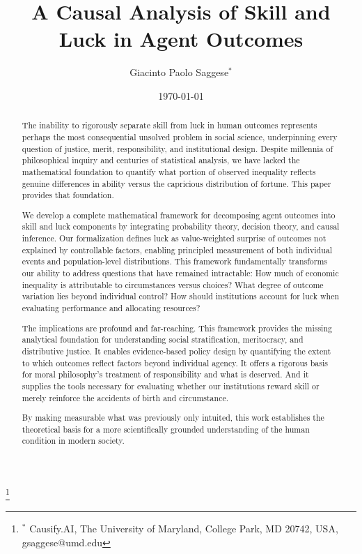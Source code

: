 \title{A Causal Analysis of Skill and Luck in Agent Outcomes}

\author{Giacinto Paolo Saggese$^{*}$}
\thanks{$^{*}$ Causify.AI, The University of Maryland, College Park, MD 20742,
USA, gsaggese@umd.edu}

\date{\today}

\maketitle

\begin{abstract}
  The inability to rigorously separate skill from luck in human outcomes
  represents perhaps the most consequential unsolved problem in social science,
  underpinning every question of justice, merit, responsibility, and institutional
  design. Despite millennia of philosophical inquiry and centuries of
  statistical analysis, we have lacked the mathematical foundation to quantify
  what portion of observed inequality reflects genuine differences in ability
  versus the capricious distribution of fortune. This paper provides
  that foundation.

  We develop a complete mathematical framework for decomposing
  agent outcomes into skill and luck components by integrating
  probability theory, decision theory, and causal inference. Our formalization
  defines luck as value-weighted surprise of outcomes not explained by controllable
  factors, enabling principled measurement of both individual events and
  population-level distributions. This framework fundamentally transforms
  our ability to address questions that have remained intractable: How
  much of economic inequality is attributable to circumstances versus
  choices? What degree of outcome variation lies beyond individual control?
  How should institutions account for luck when evaluating performance
  and allocating resources?

  The implications are profound and far-reaching. This framework provides
  the missing analytical foundation for understanding social stratification,
  meritocracy, and distributive justice. It enables evidence-based
  policy design by quantifying the extent to which outcomes reflect
  factors beyond individual agency. It offers a rigorous basis for moral
  philosophy's treatment of responsibility and what is deserved. And it supplies
  the tools necessary for evaluating whether our institutions reward
  skill or merely reinforce the accidents of birth and circumstance.

  By making measurable what was previously only intuited, this work establishes
  the theoretical basis for a more scientifically grounded understanding of the
  human condition in modern society.
\end{abstract}


